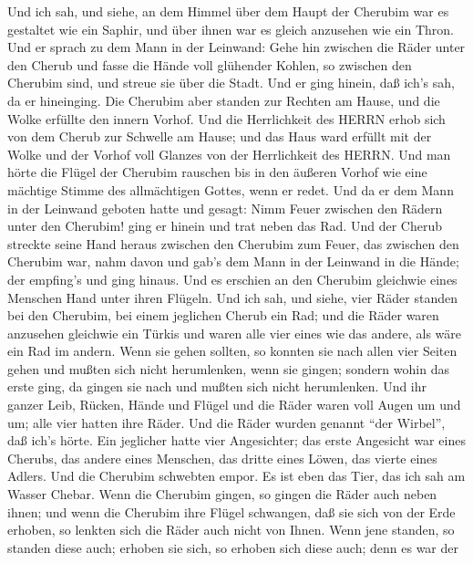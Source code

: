  Und ich sah, und siehe, an dem Himmel über dem Haupt der
Cherubim war es gestaltet wie ein Saphir, und über ihnen war es gleich
anzusehen wie ein Thron.  Und er sprach zu dem Mann in der
Leinwand: Gehe hin zwischen die Räder unter den Cherub und fasse die
Hände voll glühender Kohlen, so zwischen den Cherubim sind, und streue
sie über die Stadt. Und er ging hinein, daß ich's sah, da er hineinging.
 Die Cherubim aber standen zur Rechten am Hause, und die
Wolke erfüllte den innern Vorhof.  Und die Herrlichkeit des
HERRN erhob sich von dem Cherub zur Schwelle am Hause; und das Haus ward
erfüllt mit der Wolke und der Vorhof voll Glanzes von der Herrlichkeit
des HERRN.  Und man hörte die Flügel der Cherubim rauschen
bis in den äußeren Vorhof wie eine mächtige Stimme des allmächtigen
Gottes, wenn er redet.  Und da er dem Mann in der Leinwand
geboten hatte und gesagt: Nimm Feuer zwischen den Rädern unter den
Cherubim! ging er hinein und trat neben das Rad.  Und der
Cherub streckte seine Hand heraus zwischen den Cherubim zum Feuer, das
zwischen den Cherubim war, nahm davon und gab's dem Mann in der Leinwand
in die Hände; der empfing's und ging hinaus.  Und es
erschien an den Cherubim gleichwie eines Menschen Hand unter ihren
Flügeln.  Und ich sah, und siehe, vier Räder standen bei den
Cherubim, bei einem jeglichen Cherub ein Rad; und die Räder waren
anzusehen gleichwie ein Türkis  und waren alle vier eines
wie das andere, als wäre ein Rad im andern.  Wenn sie gehen
sollten, so konnten sie nach allen vier Seiten gehen und mußten sich
nicht herumlenken, wenn sie gingen; sondern wohin das erste ging, da
gingen sie nach und mußten sich nicht herumlenken.  Und ihr
ganzer Leib, Rücken, Hände und Flügel und die Räder waren voll Augen um
und um; alle vier hatten ihre Räder.  Und die Räder wurden
genannt ``der Wirbel'', daß ich's hörte.  Ein jeglicher
hatte vier Angesichter; das erste Angesicht war eines Cherubs, das
andere eines Menschen, das dritte eines Löwen, das vierte eines Adlers.
 Und die Cherubim schwebten empor. Es ist eben das Tier,
das ich sah am Wasser Chebar.  Wenn die Cherubim gingen, so
gingen die Räder auch neben ihnen; und wenn die Cherubim ihre Flügel
schwangen, daß sie sich von der Erde erhoben, so lenkten sich die Räder
auch nicht von Ihnen.  Wenn jene standen, so standen diese
auch; erhoben sie sich, so erhoben sich diese auch; denn es war der
